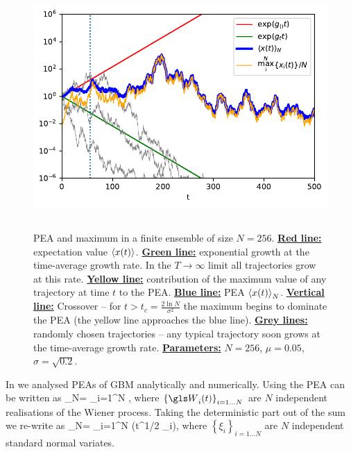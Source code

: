 \begin{figure}
\centering
\includegraphics[height=9.3cm]{./chapter_3/figs/trajectories.pdf}
\caption{PEA and maximum in a finite ensemble of size $N=256$. {\bf \underline{Red line:}} expectation value $\left\langle x(t) \right\rangle$. 
{\bf \underline{Green line:}} exponential growth at the time-average growth rate. In the $T\to\infty$ limit all trajectories grow at this rate. 
{\bf \underline{Yellow line:}} contribution of the maximum value of any trajectory at time $t$ to the PEA.  
{\bf \underline{Blue line:}} PEA $\left\langle x(t) \right\rangle_N$.
{\bf \underline{Vertical line:}} Crossover -- for $t>t_c=\frac{2\ln N}{\sigma^2}$ the maximum begins to dominate the PEA (the yellow line approaches the blue line).
{\bf \underline{Grey lines:}} randomly chosen trajectories -- any typical trajectory soon grows at the time-average growth rate.  
{\bf \underline{Parameters:}} $N=256$, $\mu=0.05$, $\sigma=\sqrt{0.2}$.}
\end{figure}
\FloatBarrier

In \cite{PetersKlein2013} we analysed PEAs of GBM analytically and numerically. Using  the PEA can be written as
\be
{}_N= \sum_{i=1}^N \exp{},
\ee
where $\left\{\gW_i(t)\right\}_{i=1\dots N}$ are $N$ independent realisations of the Wiener process. Taking the deterministic part out of the sum we re-write  as
\be
{}_N=\exp{}  \sum_{i=1}^N \exp\left(t^{1/2} \sigma \xi_i\right),
\ee
where $\left\{\xi_i\right\}_{i=1\dots N}$ are $N$ independent standard normal variates.


